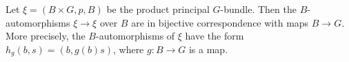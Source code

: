 Let $\xi = (B \times G, p, B)$ be the product principal $G$-bundle. Then the $B$-automorphisms $\xi \rightarrow \xi$ over $B$ are in bijective correspondence with maps $B \rightarrow G$. More precisely, the $B$-automorphisms of $\xi$ have the form $h_g(b, s) = (b, g(b)s)$, where $g: B \rightarrow G$ is a map.
